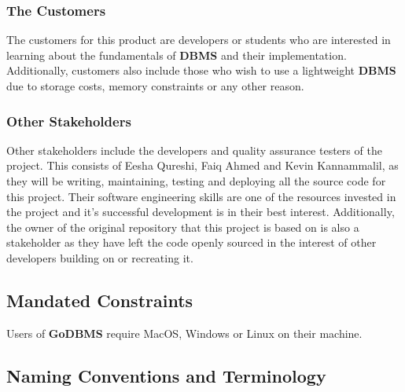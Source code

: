 \documentclass[12pt, titlepage]{article}
\begin{document}
\subsubsection{The Customers}

The customers for this product are developers or students who are interested in learning about the fundamentals of \textbf{DBMS} and their implementation. Additionally, customers also include those who wish to use a lightweight \textbf{DBMS} due to storage costs, memory constraints or any other reason.

\subsubsection{Other Stakeholders}

Other stakeholders include the developers and quality assurance testers of the project. This consists of Eesha Qureshi, Faiq Ahmed and Kevin Kannammalil, as they will be writing, maintaining, testing and deploying all the source code for this project. Their software engineering skills are one of the resources invested in the project and it's successful development is in their best interest. Additionally, the owner of the original repository that this project is based on is also a stakeholder as they have left the code openly sourced in the interest of other developers building on or recreating it.

\subsection{Mandated Constraints}
Users of \textbf{GoDBMS} require MacOS, Windows or Linux on their machine.

\subsection{Naming Conventions and Terminology}
\end{document}
